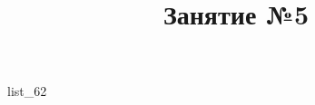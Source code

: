 \documentclass[12pt, a4paper]{article}
\begin{document}
	\title{Занятие №5}
	{list_62}
\end{document}
